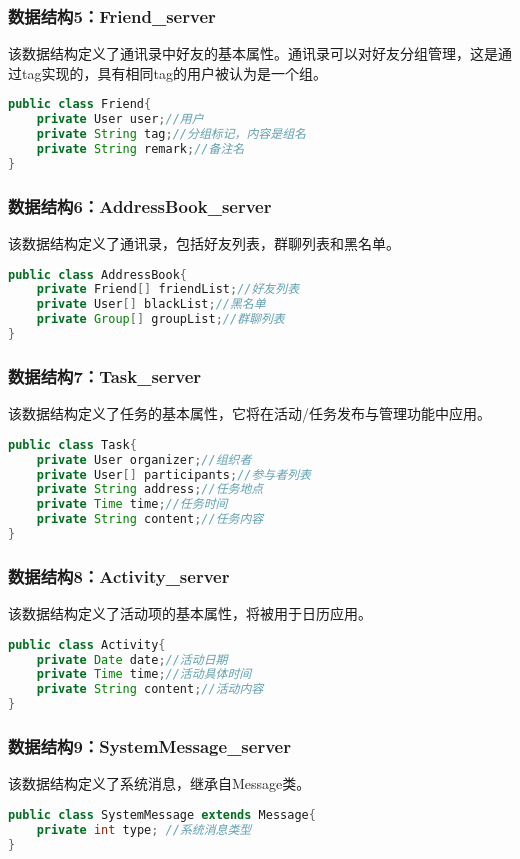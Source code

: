 \subsubsection{数据结构5：Friend\_server}
该数据结构定义了通讯录中好友的基本属性。通讯录可以对好友分组管理，这是通过tag实现的，具有相同tag的用户被认为是一个组。
\begin{lstlisting}[language=Java, caption=Friend定义]
public class Friend{
    private User user;//用户
    private String tag;//分组标记，内容是组名
    private String remark;//备注名
}
\end{lstlisting}


\subsubsection{数据结构6：AddressBook\_server}
该数据结构定义了通讯录，包括好友列表，群聊列表和黑名单。
\begin{lstlisting}[language=Java, caption=AddressBook定义]
public class AddressBook{
    private Friend[] friendList;//好友列表
    private User[] blackList;//黑名单
    private Group[] groupList;//群聊列表
}
\end{lstlisting}

\subsubsection{数据结构7：Task\_server}
该数据结构定义了任务的基本属性，它将在活动/任务发布与管理功能中应用。
\begin{lstlisting}[language=Java, caption=Task定义]
public class Task{
    private User organizer;//组织者
    private User[] participants;//参与者列表
    private String address;//任务地点
    private Time time;//任务时间
    private String content;//任务内容
}
\end{lstlisting}

\subsubsection{数据结构8：Activity\_server}
该数据结构定义了活动项的基本属性，将被用于日历应用。
\begin{lstlisting}[language=Java, caption=Activity定义]
public class Activity{
    private Date date;//活动日期
    private Time time;//活动具体时间
    private String content;//活动内容
}
\end{lstlisting}

\subsubsection{数据结构9：SystemMessage\_server}
该数据结构定义了系统消息，继承自Message类。
\begin{lstlisting}[language=Java, caption=SystemMessage定义]
public class SystemMessage extends Message{
    private int type; //系统消息类型
}
\end{lstlisting}

